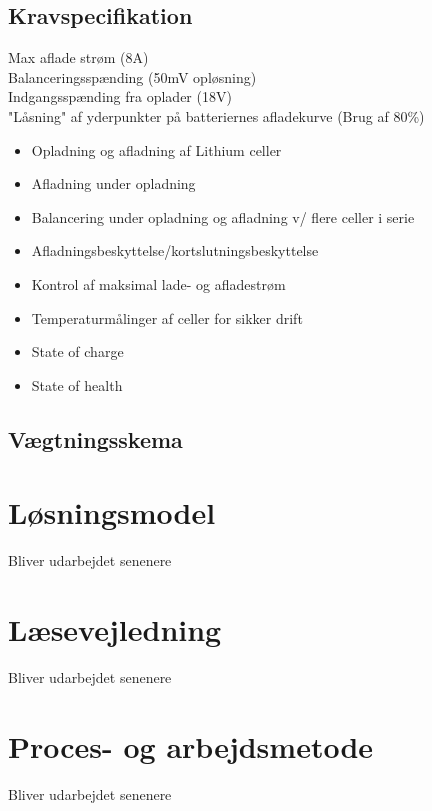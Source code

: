 \subsection{Kravspecifikation} \label{afs:kravspecifikation}
Max aflade strøm (8A) \\
Balanceringsspænding (50mV opløsning)\\
Indgangsspænding fra oplader (18V)\\
"Låsning" af yderpunkter på batteriernes afladekurve (Brug af 80\%)



\begin{itemize}
	\item Opladning og afladning af Lithium celler
	\item Afladning under opladning
	\item Balancering under opladning og afladning v/ flere celler i serie
	\item Afladningsbeskyttelse/kortslutningsbeskyttelse
	\item Kontrol af maksimal lade- og afladestrøm
	\item Temperaturmålinger af celler for sikker drift
	\item State of charge
	\item State of health
\end{itemize}

\subsection{Vægtningsskema}

\section{Løsningsmodel}
Bliver udarbejdet senenere

\section{Læsevejledning}
Bliver udarbejdet senenere

\section{Proces- og arbejdsmetode}
Bliver udarbejdet senenere
